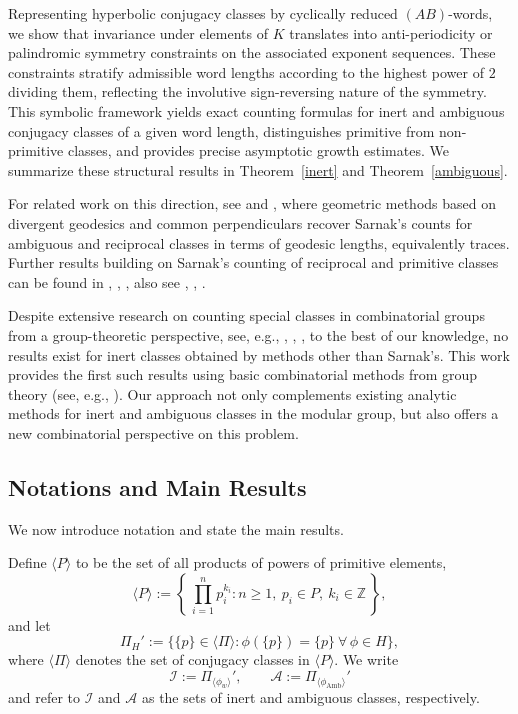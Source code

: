 \documentclass[a4paper,12pt]{amsart}
\numberwithin{equation}{section}
\theoremstyle{definition}
\numberwithin{equation}{section}
\begin{document}
Representing hyperbolic conjugacy classes by cyclically reduced $(AB)$-words, we show that invariance under elements of $K$ translates into anti-periodicity or palindromic symmetry constraints on the associated exponent sequences. These constraints stratify admissible word lengths according to the highest power of $2$ dividing them, reflecting the involutive sign-reversing nature of the symmetry. This symbolic framework yields exact counting formulas for inert and ambiguous conjugacy classes of a given word length, distinguishes primitive from non-primitive classes, and provides precise asymptotic growth estimates. We summarize these structural results in Theorem~\ref{inert} and Theorem~\ref{ambiguous}. 

For related work on this direction, see \cite{paulin2} and \cite{paulin1}, where geometric methods based on divergent geodesics and common perpendiculars recover Sarnak’s counts for ambiguous and reciprocal classes in terms of geodesic lengths, equivalently traces. Further results building on Sarnak’s counting of reciprocal and primitive classes can be found in \cite{bv2},  \cite{bk}, \cite{es}, also see \cite{bmv}, \cite{das2024combinatorial}, \cite{dg2025}. 

Despite extensive research on counting special classes in combinatorial groups from a group-theoretic perspective, see, e.g., \cite{gs},  \cite{park}, \cite{rivin},  to the best of our knowledge, no results exist for inert classes obtained by methods other than Sarnak’s. This work provides the first such results using basic combinatorial methods from group theory (see, e.g., \cite{mgs}). Our approach not only complements existing analytic methods for inert and ambiguous classes in the modular group, but also offers a new combinatorial perspective on this  problem.
\subsection{Notations and Main Results}
We now introduce notation and state the main results.

Define $\langle P \rangle$ to be the set of all products of powers of primitive elements,
\[
\langle P \rangle := \left\{\, \prod_{i=1}^{n} p_i^{k_i} : n\geq 1,\ p_i \in P,\ k_i \in \mathbb{Z}\,\right\},
\]
and let
\[
\Pi_H' := \{\{p\}\in\langle\Pi\rangle : \phi(\{p\})=\{p\}\ \forall\,\phi\in H\},
\]
where $\langle\Pi\rangle$ denotes the set of conjugacy classes in $\langle P\rangle$. We write
\[
\mathscr{I} := \Pi_{\langle\phi_w\rangle}', 
\qquad
\mathscr{A} := \Pi_{\langle\phi_{\mathrm{Amb}}\rangle}'
\]
and refer to $\mathscr I$ and $\mathscr A$ as the sets of inert and ambiguous classes, respectively.
\end{document}
